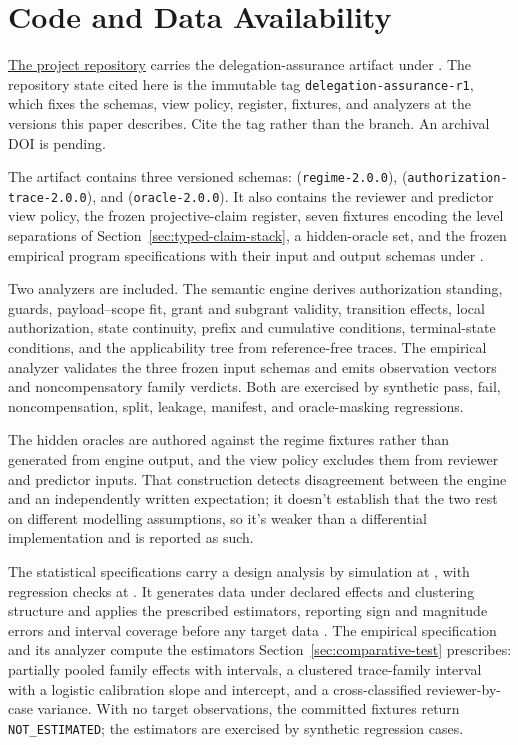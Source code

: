 \section*{Code and Data Availability}

\href{https://github.com/BrettRey/adversarial-pragmatics-for-ai-safety-evaluation}{The project repository} carries the delegation-assurance artifact under . The repository state cited here is the immutable tag \texttt{delegation-assurance-r1}, which fixes the schemas, view policy, register, fixtures, and analyzers at the versions this paper describes. Cite the tag rather than the branch. An archival DOI is pending.

The artifact contains three versioned schemas:  (\texttt{regime-2.0.0}),  (\texttt{authorization-trace-2.0.0}), and  (\texttt{oracle-2.0.0}). It also contains the reviewer and predictor view policy, the frozen projective-claim register, seven fixtures encoding the level separations of Section~\ref{sec:typed-claim-stack}, a hidden-oracle set, and the frozen empirical program specifications with their input and output schemas under .

Two analyzers are included. The semantic engine derives authorization standing, guards, payload--scope fit, grant and subgrant validity, transition effects, local authorization, state continuity, prefix and cumulative conditions, terminal-state conditions, and the applicability tree from reference-free traces. The empirical analyzer validates the three frozen input schemas and emits observation vectors and noncompensatory family verdicts. Both are exercised by synthetic pass, fail, noncompensation, split, leakage, manifest, and oracle-masking regressions.

The hidden oracles are authored against the regime fixtures rather than generated from engine output, and the view policy excludes them from reviewer and predictor inputs. That construction detects disagreement between the engine and an independently written expectation; it doesn't establish that the two rest on different modelling assumptions, so it's weaker than a differential implementation and is reported as such.

The statistical specifications carry a design analysis by simulation at , with regression checks at . It generates data under declared effects and clustering structure and applies the prescribed estimators, reporting sign and magnitude errors and interval coverage before any target data \citep{gelman2014types}. The empirical specification and its analyzer compute the estimators Section~\ref{sec:comparative-test} prescribes: partially pooled family effects with intervals, a clustered trace-family interval with a logistic calibration slope and intercept, and a cross-classified reviewer-by-case variance. With no target observations, the committed fixtures return \texttt{NOT\_ESTIMATED}; the estimators are exercised by synthetic regression cases.


